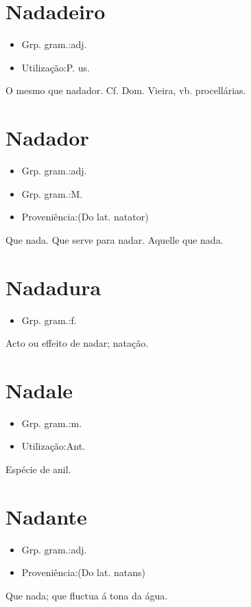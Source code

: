 \section{Nadadeiro}
\begin{itemize}
\item {Grp. gram.:adj.}
\end{itemize}
\begin{itemize}
\item {Utilização:P. us.}
\end{itemize}
O mesmo que \textunderscore nadador\textunderscore . Cf. Dom. Vieira, vb. \textunderscore procellárias\textunderscore .
\section{Nadador}
\begin{itemize}
\item {Grp. gram.:adj.}
\end{itemize}
\begin{itemize}
\item {Grp. gram.:M.}
\end{itemize}
\begin{itemize}
\item {Proveniência:(Do lat. \textunderscore natator\textunderscore )}
\end{itemize}
Que nada.
Que serve para nadar.
Aquelle que nada.
\section{Nadadura}
\begin{itemize}
\item {Grp. gram.:f.}
\end{itemize}
Acto ou effeito de \textunderscore nadar\textunderscore ; natação.
\section{Nadale}
\begin{itemize}
\item {Grp. gram.:m.}
\end{itemize}
\begin{itemize}
\item {Utilização:Ant.}
\end{itemize}
Espécie de anil.
\section{Nadante}
\begin{itemize}
\item {Grp. gram.:adj.}
\end{itemize}
\begin{itemize}
\item {Proveniência:(Do lat. \textunderscore natans\textunderscore )}
\end{itemize}
Que nada; que fluctua á tona da água.
